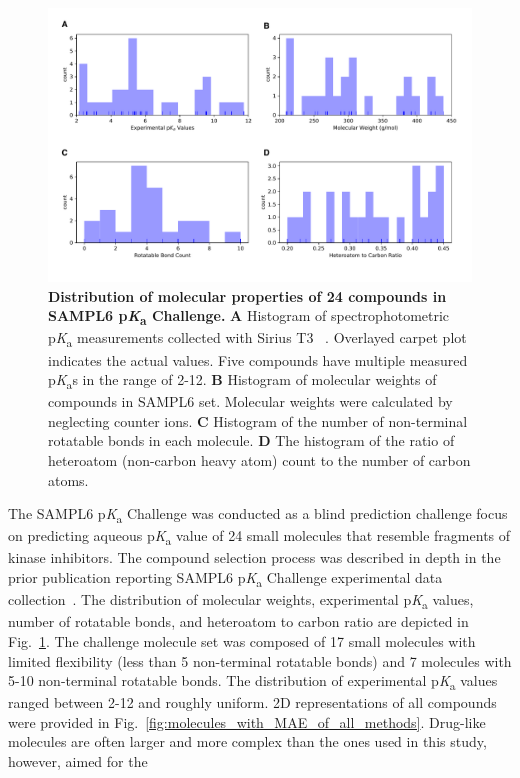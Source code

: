 \documentclass[9pt,lineno,final]{elife}
\newcommand{\pKa}{p\textit{K}\textsubscript{a}}
\begin{document}
\begin{figure}
\begin{center}
\includegraphics[width=1.0\linewidth]{figures/distribution_of_molecular_properties.pdf}
\caption{{\bf Distribution of molecular properties of 24 compounds in SAMPL6 \pKa{} Challenge.} {\bf A} Histogram of spectrophotometric \pKa{} measurements collected with Sirius T3 ~\cite{Isik:2018:J.Comput.AidedMol.Des.}. Overlayed carpet plot indicates the actual values. Five compounds have multiple measured \pKa{}s in the range of 2-12. {\bf B} Histogram of molecular weights of compounds in SAMPL6 set. Molecular weights were calculated by neglecting counter ions. {\bf C} Histogram of the number of non-terminal rotatable bonds in each molecule. {\bf D} The histogram of the ratio of heteroatom (non-carbon heavy atom) count to the number of carbon atoms.
}
\label{fig:dist_mol_prop}
\end{center}
\end{figure}

The SAMPL6 \pKa{} Challenge was conducted as a blind prediction challenge focus on predicting aqueous \pKa{} value of 24 small molecules that resemble fragments of kinase inhibitors. 
The compound selection process was described in depth in the prior publication reporting SAMPL6 \pKa{} Challenge experimental data collection~\citep{Isik:2018:J.Comput.AidedMol.Des.}.
The distribution of molecular weights, experimental \pKa{} values, number of rotatable bonds, and heteroatom to carbon ratio are depicted in Fig.~\ref{fig:dist_mol_prop}. The challenge molecule set was composed of 17 small molecules with limited flexibility (less than 5 non-terminal rotatable bonds) and 7 molecules with 5-10 non-terminal rotatable bonds. 
The distribution of experimental \pKa{} values ranged between 2-12 and roughly uniform. 
2D representations of all compounds were provided in Fig.~\ref{fig:molecules_with_MAE_of_all_methods}. 
Drug-like molecules are often larger and more complex than the ones used in this study, however, aimed for the
\end{document}

